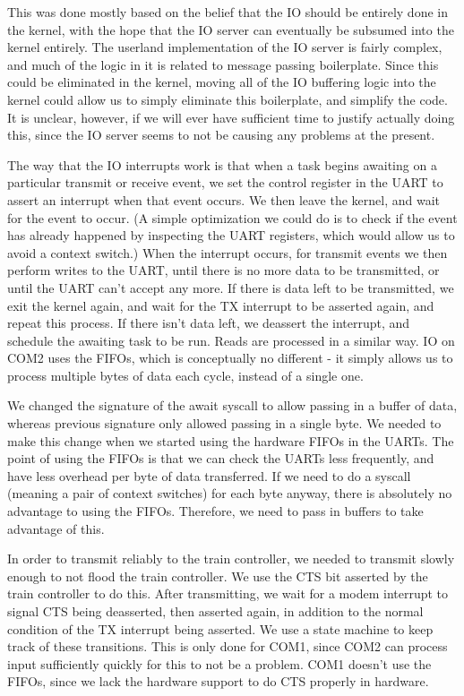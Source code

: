 \documentclass[titlepage]{article}
\begin{document}
This was done mostly based on the belief that the IO should be entirely done in the kernel,
with the hope that the IO server can eventually be subsumed into the kernel entirely.
The userland implementation of the IO server is fairly complex, and much of the logic
in it is related to message passing boilerplate.
Since this could be eliminated in the kernel, moving all of the IO buffering logic
into the kernel could allow us to simply eliminate this boilerplate, and simplify the code.
It is unclear, however, if we will ever have sufficient time to justify actually doing
this, since the IO server seems to not be causing any problems at the present.

The way that the IO interrupts work is that when a task begins awaiting on a particular
transmit or receive event, we set the control register in the UART to assert an interrupt
when that event occurs.
We then leave the kernel, and wait for the event to occur.
(A simple optimization we could do is to check if the event has already happened by
inspecting the UART registers, which would allow us to avoid a context switch.)
When the interrupt occurs, for transmit events we then perform writes to the UART,
until there is no more data to be transmitted, or until the UART can't accept any more.
If there is data left to be transmitted, we exit the kernel again, and wait for the TX
interrupt to be asserted again, and repeat this process.
If there isn't data left, we deassert the interrupt, and schedule the awaiting task
to be run.
Reads are processed in a similar way.
IO on COM2 uses the FIFOs, which is conceptually no different - it simply allows
us to process multiple bytes of data each cycle, instead of a single one.

We changed the signature of the await syscall to allow passing in a buffer of data,
whereas previous signature only allowed passing in a single byte.
We needed to make this change when we started using the hardware FIFOs in the UARTs.
The point of using the FIFOs is that we can check the UARTs less frequently, and have
less overhead per byte of data transferred.
If we need to do a syscall (meaning a pair of context switches) for each byte anyway,
there is absolutely no advantage to using the FIFOs.
Therefore, we need to pass in buffers to take advantage of this.

In order to transmit reliably to the train controller, we needed to transmit slowly
enough to not flood the train controller.
We use the CTS bit asserted by the train controller to do this.
After transmitting, we wait for a modem interrupt to signal CTS being deasserted, then
asserted again, in addition to the normal condition of the TX interrupt being asserted.
We use a state machine to keep track of these transitions.
This is only done for COM1, since COM2 can process input sufficiently quickly for
this to not be a problem.
COM1 doesn't use the FIFOs, since we lack the hardware support to do CTS properly
in hardware.
\end{document}
